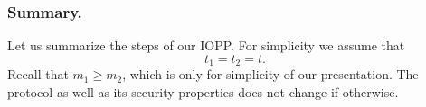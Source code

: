 \subsubsection{Summary.}
Let us summarize the steps of our IOPP. 
For simplicity we assume that 
\[
t_1 = t_2 = t.
\]
Recall that $m_1\geq m_2$, which is only for simplicity of our presentation. 
The protocol as well as its security properties does not change if otherwise.





